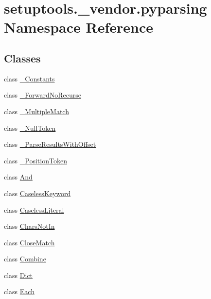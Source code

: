 \hypertarget{namespacesetuptools_1_1__vendor_1_1pyparsing}{}\section{setuptools.\+\_\+vendor.\+pyparsing Namespace Reference}
\label{namespacesetuptools_1_1__vendor_1_1pyparsing}
\subsection*{Classes}
\begin{DoxyCompactItemize}
\item 
class \hyperlink{classsetuptools_1_1__vendor_1_1pyparsing_1_1___constants}{\+\_\+\+Constants}
\item 
class \hyperlink{classsetuptools_1_1__vendor_1_1pyparsing_1_1___forward_no_recurse}{\+\_\+\+Forward\+No\+Recurse}
\item 
class \hyperlink{classsetuptools_1_1__vendor_1_1pyparsing_1_1___multiple_match}{\+\_\+\+Multiple\+Match}
\item 
class \hyperlink{classsetuptools_1_1__vendor_1_1pyparsing_1_1___null_token}{\+\_\+\+Null\+Token}
\item 
class \hyperlink{classsetuptools_1_1__vendor_1_1pyparsing_1_1___parse_results_with_offset}{\+\_\+\+Parse\+Results\+With\+Offset}
\item 
class \hyperlink{classsetuptools_1_1__vendor_1_1pyparsing_1_1___position_token}{\+\_\+\+Position\+Token}
\item 
class \hyperlink{classsetuptools_1_1__vendor_1_1pyparsing_1_1_and}{And}
\item 
class \hyperlink{classsetuptools_1_1__vendor_1_1pyparsing_1_1_caseless_keyword}{Caseless\+Keyword}
\item 
class \hyperlink{classsetuptools_1_1__vendor_1_1pyparsing_1_1_caseless_literal}{Caseless\+Literal}
\item 
class \hyperlink{classsetuptools_1_1__vendor_1_1pyparsing_1_1_chars_not_in}{Chars\+Not\+In}
\item 
class \hyperlink{classsetuptools_1_1__vendor_1_1pyparsing_1_1_close_match}{Close\+Match}
\item 
class \hyperlink{classsetuptools_1_1__vendor_1_1pyparsing_1_1_combine}{Combine}
\item 
class \hyperlink{classsetuptools_1_1__vendor_1_1pyparsing_1_1_dict}{Dict}
\item 
class \hyperlink{classsetuptools_1_1__vendor_1_1pyparsing_1_1_each}{Each}

\end{DoxyCompactItemize}
